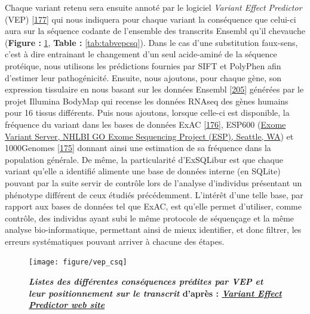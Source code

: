 \documentclass[12pt,a4paper,twoside]{ugathesis}
\theoremstyle{definition}
\theoremstyle{definition}
\theoremstyle{definition}
\theoremstyle{remark}
\begin{document}
Chaque variant retenu sera ensuite annoté par le logiciel \emph{Variant
Effect Predictor} (VEP) {[}\protect\hyperlink{ref-McLaren2016}{177}{]}
qui nous indiquera pour chaque variant la conséquence que celui-ci aura
sur la séquence codante de l'ensemble des transcrits Ensembl qu'il
chevauche (\textbf{Figure : }\ref{fig:pictvepcsq}, \textbf{Table :
}\ref{tab:tabvepcsq}). Dans le cas d'une substitution faux-sens, c'est à
dire entrainant le changement d'un seul acide-aminé de la séquence
protéique, nous utilisons les prédictions fournies par SIFT et PolyPhen
afin d'estimer leur pathogénicité. Ensuite, nous ajoutons, pour chaque
gène, son expression tissulaire en nous basant sur les données Ensembl
{[}\protect\hyperlink{ref-Aken2017}{205}{]} générées par le projet
Illumina BodyMap qui recense les données RNAseq des gènes humains pour
16 tissus différents. Puis nous ajoutons, lorsque celle-ci est
disponible, la fréquence du variant dans les bases de données ExAC
{[}\protect\hyperlink{ref-Lek2016}{176}{]}, ESP600
(\href{http://evs.gs.washington.edu/EVS/}{Exome Variant Server, NHLBI GO
Exome Sequencing Project (ESP), Seattle, WA}) et 1000Genomes
{[}\protect\hyperlink{ref-1000GenomesProjectConsortium2015}{175}{]}
donnant ainsi une estimation de sa fréquence dans la population
générale. De même, la particularité d'ExSQLibur est que chaque variant
qu'elle a identifié alimente une base de données interne (en SQLite)
pouvant par la suite servir de contrôle lors de l'analyse d'individus
présentant un phénotype différent de ceux étudiés précédemment.
L'intérêt d'une telle base, par rapport aux bases de données tel que
ExAC, est qu'elle permet d'utiliser, comme contrôle, des individus ayant
subi le même protocole de séquençage et la même analyse
bio-informatique, permettant ainsi de mieux identifier, et donc filtrer,
les erreurs systématiques pouvant arriver à chacune des étapes.

\begin{figure}

{\centering \texttt{[image: figure/vep\_csq]} 

}

\caption[Listes des différentes conséquences prédites par VEP et leur positionnement sur le transcrit]{\textbf{\emph{Listes des différentes conséquences
prédites par VEP et leur positionnement sur le transcrit} d'après :
\href{http://www.ensembl.org/info/genome/variation/consequences.jpg}{\emph{Variant
Effect Predictor web site}}}}\label{fig:pictvepcsq}
\end{figure}
\end{document}
